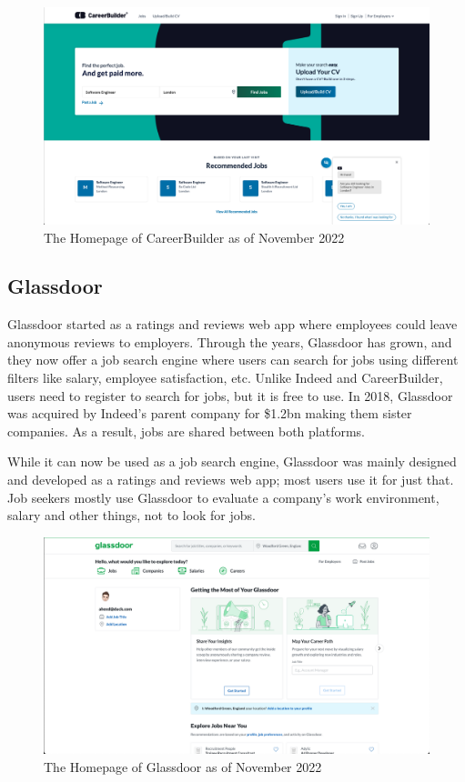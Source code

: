 \begin{figure}
    \noindent
    \centering
    \includegraphics[width = 140mm]{Figures/CareerBuilderHomepage.png}
    \decoRule
    \caption[CareerBuilder's Homepage]{The Homepage of CareerBuilder as of November 2022}
    \label{fig:CareerBuilder Homepage}
\end{figure}

\subsection{Glassdoor}
Glassdoor started as a ratings and reviews web app where employees could leave anonymous reviews to employers. Through the years, Glassdoor has grown, and they now offer a job search engine where users can search for jobs using different filters like salary, employee satisfaction, etc. Unlike Indeed and CareerBuilder, users need to register to search for jobs, but it is free to use. In 2018, Glassdoor was acquired by Indeed's parent company for \$1.2bn making them sister companies. As a result, jobs are shared between both platforms. \parencite{Reference17}

While it can now be used as a job search engine, Glassdoor was mainly designed and developed as a ratings and reviews web app; most users use it for just that. Job seekers mostly use Glassdoor to evaluate a company's work environment, salary and other things, not to look for jobs.

\begin{figure}
    \noindent
    \centering
    \includegraphics[width = 140mm]{Figures/GlassdoorHomepage.png}
    \decoRule
    \caption[Glassdoor's Homepage]{The Homepage of Glassdoor as of November 2022}
    \label{fig:Glassdoor Homepage}
\end{figure}

